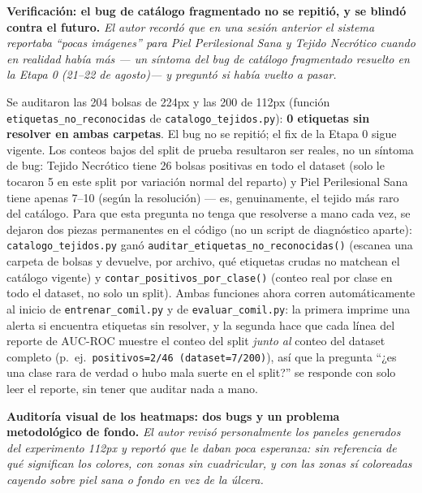 \documentclass[12pt,letterpaper]{report}
\newcommand{\entrada}[2]{%
    \vspace{0.6em}
    \noindent\textbf{#1.} \textit{#2}
    \vspace{0.3em}
    \par
}
\begin{document}
\entrada{Verificación: el bug de catálogo fragmentado no se repitió, y se blindó contra el futuro}{El
autor recordó que en una sesión anterior el sistema reportaba ``pocas imágenes'' para Piel
Perilesional Sana y Tejido Necrótico cuando en realidad había más --- un síntoma del bug de catálogo
fragmentado resuelto en la Etapa 0 (21--22 de agosto)--- y preguntó si había vuelto a pasar.}

Se auditaron las 204 bolsas de 224px y las 200 de 112px (función
\texttt{etiquetas\_no\_reconocidas} de \texttt{catalogo\_tejidos.py}): \textbf{0 etiquetas sin
resolver en ambas carpetas}. El bug no se repitió; el fix de la Etapa 0 sigue vigente. Los conteos bajos del split de
prueba resultaron ser reales, no un síntoma de bug: Tejido Necrótico tiene 26 bolsas positivas en
todo el dataset (solo le tocaron 5 en este split por variación normal del reparto) y Piel
Perilesional Sana tiene apenas 7--10 (según la resolución) --- es, genuinamente, el tejido más raro
del catálogo. Para que esta pregunta no tenga que resolverse a mano cada vez, se dejaron dos piezas
permanentes en el código (no un script de diagnóstico aparte): \texttt{catalogo\_tejidos.py} ganó
\texttt{auditar\_etiquetas\_no\_reconocidas()} (escanea una carpeta de bolsas y devuelve, por
archivo, qué etiquetas crudas no matchean el catálogo vigente) y
\texttt{contar\_positivos\_por\_clase()} (conteo real por clase en todo el dataset, no solo un
split). Ambas funciones ahora corren automáticamente al inicio de \texttt{entrenar\_comil.py} y de
\texttt{evaluar\_comil.py}: la primera imprime una alerta si encuentra etiquetas sin resolver, y la
segunda hace que cada línea del reporte de AUC-ROC muestre el conteo del split \emph{junto al}
conteo del dataset completo (p.\ ej.\ \texttt{positivos=2/46 (dataset=7/200)}), así que la pregunta
``¿es una clase rara de verdad o hubo mala suerte en el split?'' se responde con solo leer el
reporte, sin tener que auditar nada a mano.

\entrada{Auditoría visual de los heatmaps: dos bugs y un problema metodológico de fondo}{El autor
revisó personalmente los paneles generados del experimento 112px y reportó que le daban poca
esperanza: sin referencia de qué significan los colores, con zonas sin cuadricular, y con las zonas
sí coloreadas cayendo sobre piel sana o fondo en vez de la úlcera.}
\end{document}

